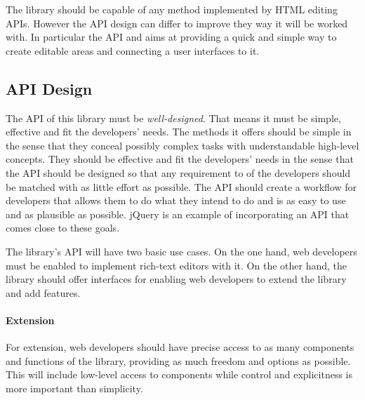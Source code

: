 
The library should be capable of any method implemented by HTML editing APIs. However the API design can differ to improve they way it will be worked with. In particular the API and aims at providing a quick and simple way to create editable areas and connecting a user interfaces to it.

\subsection{API Design}


The API of this library must be \textit{well-designed}. That means it must be simple, effective and fit the developers' needs. The methods it offers should be simple in the sense that they conceal possibly complex tasks with understandable high-level concepts. They should be effective and fit the developers' needs in the sense that the API should be designed so that any requirement to of the developers should be matched with as little effort as possible. The API should create a workflow for developers that allows them to do what they intend to do and is as easy to use and as plausible as possible. jQuery is an example of incorporating an API that comes close to these goals.

The library's API will have two basic use cases. On the one hand, web developers must be enabled to implement rich-text editors with it. On the other hand, the library should offer interfaces for enabling web developers to extend the library and add features.

\paragraph{Extension}

For extension, web developers should have precise access to as many components and functions of the library, providing as much freedom and options as possible. This will include low-level access to components while control and explicitness is more important than simplicity. 

